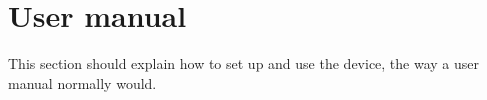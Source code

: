 \chapter{User manual}

This section should explain how to set up and use the device, the way a user manual normally would.
